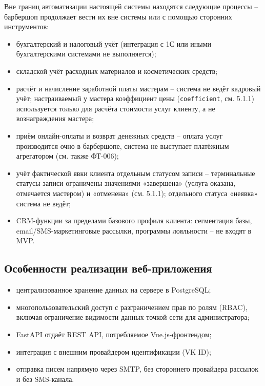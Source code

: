 Вне границ автоматизации настоящей системы находятся следующие процессы -- барбершоп продолжает вести их вне системы или с помощью сторонних инструментов:
\begin{itemize}
  \item бухгалтерский и налоговый учёт (интеграция с 1С или иными бухгалтерскими системами не выполняется);
  \item складской учёт расходных материалов и косметических средств;
  \item расчёт и начисление заработной платы мастерам -- система не ведёт кадровый учёт; настраиваемый у мастера коэффициент цены (\texttt{coefficient}, см. 5.1.1) используется только для расчёта стоимости услуг клиенту, а не вознаграждения мастера;
  \item приём онлайн-оплаты и возврат денежных средств -- оплата услуг производится очно в барбершопе, система не выступает платёжным агрегатором (см. также ФТ-006);
  \item учёт фактической явки клиента отдельным статусом записи -- терминальные статусы записи ограничены значениями «завершена» (услуга оказана, отмечается мастером) и «отменена» (см. 5.1.1); отдельного статуса «неявка» система не ведёт;
  \item CRM-функции за пределами базового профиля клиента: сегментация базы, email/SMS-маркетинговые рассылки, программы лояльности -- не входят в MVP.
\end{itemize}

\subsection{Особенности реализации веб-приложения}

\begin{itemize}
  \item централизованное хранение данных на сервере в PostgreSQL;
  \item многопользовательский доступ с разграничением прав по ролям (RBAC), включая ограничение видимости данных точкой сети для администратора;
  \item FastAPI отдаёт REST API, потребляемое Vue.js-фронтендом;
  \item интеграция с внешним провайдером идентификации (VK ID);
  \item отправка писем напрямую через SMTP, без стороннего провайдера рассылок и без SMS-канала.
\end{itemize}

